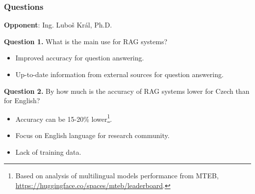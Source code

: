\documentclass{beamer}
\newif\ifplacelogo
\begin{document}
\placelogotrue
\begin{frame}
  \frametitle{Questions}
  \textcolor{cvut_navy}{\textbf{Opponent}}: Ing. Luboš Král, Ph.D.

  \vspace{20px}
  
  \textcolor{cvut_navy}{\textbf{Question 1.}} What is the main use for RAG systems?
  \begin{itemize}
    \item Improved accuracy for question answering.
    \item Up-to-date information from external sources for question answering.
  \end{itemize}
  \textcolor{cvut_navy}{\textbf{Question 2.}} By how much is the accuracy of RAG systems lower for Czech than for English?  
  \begin{itemize}
    \item Accuracy can be 15-20\% lower\footnote{Based on analysis of multilingual models performance from MTEB, \url{https://huggingface.co/spaces/mteb/leaderboard}.}.
    \item Focus on English language for research community.
    \item Lack of training data.
  \end{itemize}
\end{frame}
\end{document}
